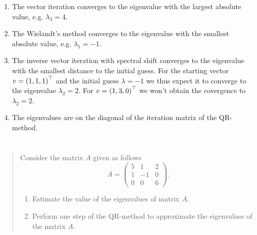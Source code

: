 \documentclass{exercise}
\begin{document}
	\begin{enumerate}
		\item The vector iteration converges to the eigenvalue with the largest absolute value, e.g. \(\lambda_3 = 4\).
		\item The Wielandt's method converges to the eigenvalue with the smallest absolute value, e.g. \(\lambda_1 = -1\).
		\item The inverse vector iteration with spectral shift converges to the eigenvalue with the smallest distance to the initial guess. For the starting vector \(v = \parentheses*{1, 1, 1}^\top\) and the initial guess \(\lambda = -1\) we thus expect it to converge to the eigenvalue \(\lambda_2 = 2\). For \(v = \parentheses*{1, 3, 0}^\top\) we won't obtain the covergence to \(\lambda_2 = 2\).
		\item The eigenvalues are on the diagonal of the iteration matrix of the QR-method.
	\end{enumerate}


	\section{}

	\begin{quote}
		Consider the matrix \(A\) given as follows
		\[
			A = \begin{pmatrix}
				5 & 1 & 2\\
				1 & -1 & 0\\
				0 & 0 & 6
			\end{pmatrix}.
		\]
		\begin{enumerate}
			\item Estimate the value of the eigenvalues of matrix \(A\).
			\item Perform one step of the QR-method to approximate the eigenvalues of the matrix \(A\).
		\end{enumerate}
	\end{quote}
\end{document}
